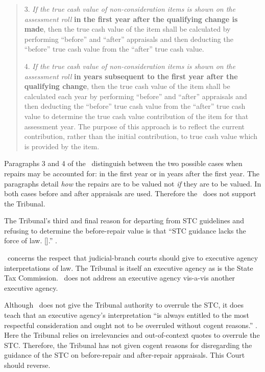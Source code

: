 \documentclass[12pt,\documentclassflag]{michiganCourtOfAppealsBrief}
\begin{document}
\begin{quotation}
3. {\em If the true cash value of non-consideration items is shown on the assessment roll} \textbf{in the first year after the qualifying change is made}, then the true cash value of the item shall be calculated by performing ``before'' and ``after'' appraisals and then deducting the ``before'' true cash value from the ``after'' true cash value.

4. {\em If the true cash value of non-consideration items is shown on the assessment roll} \textbf{in years subsequent to the first year after the qualifying change}, then the true cash value of the item shall be calculated each year by performing ``before'' and ``after'' appraisals and then deducting the ``before'' true cash value from the ``after'' true cash value to determine the true cash value contribution of the item for that assessment year. The purpose of this approach is to reflect the current contribution, rather than the initial contribution, to true cash value which is provided by the item.
\end{quotation}

Paragraphs 3 and 4 of the \cite[s]{STC Bulletin}\ distinguish between the two possible cases when repairs may be accounted for: in the first year or in years after the first year. The paragraphs detail {\em how} the repairs are to be valued not {\em if} they are to be valued. In both cases before and after appraisals are used. Therefore the \cite[s]{STC Bulletin}\ does not support the Tribunal.

The Tribunal's third and final reason for departing from STC guidelines and refusing to determine the before-repair value is that ``STC guidance lacks the force of law. [].'' \reconsiderationDenied[2].

\cite[s]{Rovas}\ concerns the respect that judicial-branch courts should give to executive agency interpretations of law. The Tribunal is itself an executive agency as is the State Tax Commission. \cite[s]{Rovas}\ does not address an executive agency vis-a-vis another executive agency.

Although \cite[s]{Rovas}\ does not give the Tribunal authority to overrule the STC, it does teach that an executive agency's interpretation ``is always entitled to the most respectful consideration and ought not to be overruled without cogent reasons.'' . Here the Tribunal relies on irrelevancies and out-of-context quotes to overrule the STC.
Therefore, the Tribunal has not given cogent reasons for disregarding the guidance of the STC on before-repair and after-repair appraisals. This Court should reverse. 
\end{document}
